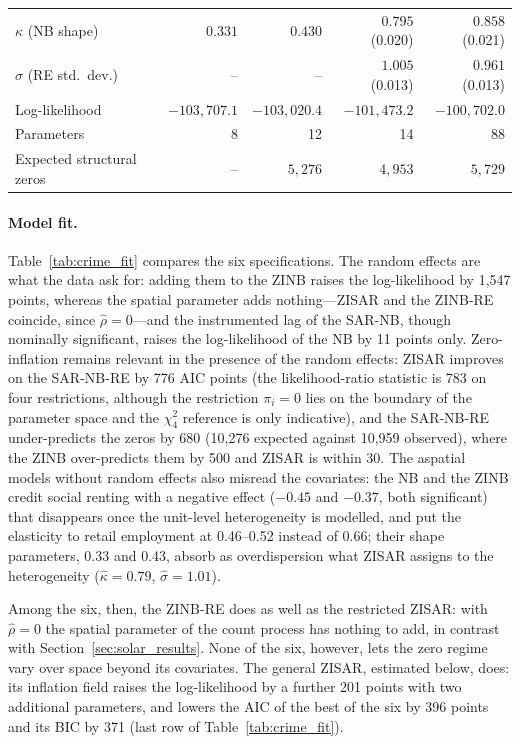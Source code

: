 \begin{table}[htbp]
\begin{tabular}{lrrrr}
\midrule
$\kappa$ (NB shape)            & $0.331$ & $0.430$ & $0.795$ (0.020)  & $0.858$ (0.021) \\
$\sigma$ (RE std.\ dev.)       & --      & --      & $1.005$ (0.013)  & $0.961$ (0.013) \\
Log-likelihood                 & $-103{,}707.1$ & $-103{,}020.4$ & $-101{,}473.2$   & $-100{,}702.0$ \\
Parameters                     & 8  & 12 & 14               & 88 \\
Expected structural zeros      & -- & $5{,}276$ & $4{,}953$        & $5{,}729$ \\
\bottomrule
\end{tabular}
\end{table}

\paragraph{Model fit.}
Table~\ref{tab:crime_fit} compares the six specifications.
The random effects are what the data ask for: adding them to the ZINB raises the log-likelihood by 1{,}547 points, whereas the spatial parameter adds nothing---ZISAR and the ZINB-RE coincide, since $\hat\rho = 0$---and the instrumented lag of the SAR-NB, though nominally significant, raises the log-likelihood of the NB by 11 points only.
Zero-inflation remains relevant in the presence of the random effects: ZISAR improves on the SAR-NB-RE by 776 AIC points (the likelihood-ratio statistic is 783 on four restrictions, although the restriction $\pi_i = 0$ lies on the boundary of the parameter space and the $\chi^2_4$ reference is only indicative), and the SAR-NB-RE under-predicts the zeros by 680 (10{,}276 expected against 10{,}959 observed), where the ZINB over-predicts them by 500 and ZISAR is within 30.
The aspatial models without random effects also misread the covariates: the NB and the ZINB credit social renting with a negative effect ($-0.45$ and $-0.37$, both significant) that disappears once the unit-level heterogeneity is modelled, and put the elasticity to retail employment at 0.46--0.52 instead of 0.66; their shape parameters, 0.33 and 0.43, absorb as overdispersion what ZISAR assigns to the heterogeneity ($\hat\kappa = 0.79$, $\hat\sigma = 1.01$).

Among the six, then, the ZINB-RE does as well as the restricted ZISAR: with $\hat\rho = 0$ the spatial parameter of the count process has nothing to add, in contrast with Section~\ref{sec:solar_results}.
None of the six, however, lets the zero regime vary over space beyond its covariates.
The general ZISAR, estimated below, does: its inflation field raises the log-likelihood by a further 201 points with two additional parameters, and lowers the AIC of the best of the six by 396 points and its BIC by 371 (last row of Table~\ref{tab:crime_fit}).


